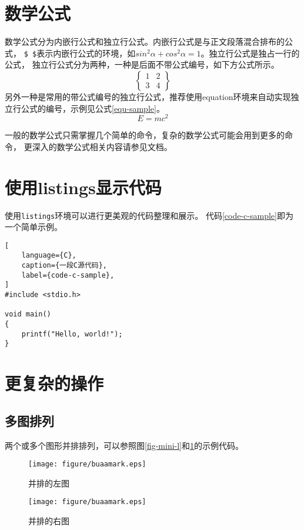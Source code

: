 \section{数学公式}
\label{sec-math}
数学公式分为内嵌行公式和独立行公式。内嵌行公式是与正文段落混合排布的公式，
\verb|$ $|表示内嵌行公式的环境，如$sin^2{\alpha}+cos^2{\alpha}=1$。独立行公式是独占一行的公式，
独立行公式分为两种，一种是后面不带公式编号，如下方公式所示。$$\begin{Bmatrix}1 & 2\\3 &4\end{Bmatrix}$$
另外一种是常用的带公式编号的独立行公式，推荐使用equation环境来自动实现独立行公式的编号，示例见公式\eqref{equ-sample}。
\begin{equation}
    \label{equ-sample}
    E=mc^2
\end{equation}

一般的数学公式只需掌握几个简单的命令，复杂的数学公式可能会用到更多的命令，
更深入的数学公式相关内容请参见文档。

\section{使用listings显示代码}
\label{sec-listings}
使用\texttt{listings}环境可以进行更美观的代码整理和展示。
代码\ref{code-c-sample}即为一个简单示例。
\begin{lstlisting}[
    language={C},
    caption={一段C源代码},
    label={code-c-sample},
]
#include <stdio.h>

void main()
{
    printf("Hello, world!");
}
\end{lstlisting}

\section{更复杂的操作}
\label{sec-more}

\subsection{多图排列}
\label{subsec-multi-fig}
两个或多个图形并排排列，可以参照图\ref{fig-mini-l}和\ref{fig-mini-r}的示例代码。
\begin{figure}[h!] %
    \begin{minipage}{.5\textwidth} %
        \centering
        \texttt{[image: figure/buaamark.eps]}
        \caption{并排的左图}
        \label{fig-mini-l}
    \end{minipage}
    \begin{minipage}{.5\textwidth}
        \centering
        \texttt{[image: figure/buaamark.eps]}
        \caption{并排的右图}
        \label{fig-mini-r}
    \end{minipage}
\end{figure}

